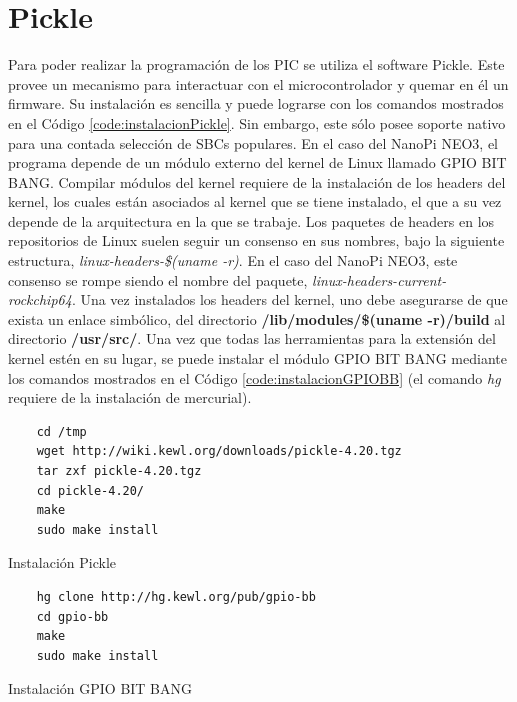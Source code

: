 \documentclass[12pt,letterpaper]{article}     %
\begin{document}
\clearpage
\section{Pickle}

Para poder realizar la programación de los PIC se utiliza el software Pickle. 
Este provee un mecanismo para interactuar con el microcontrolador y quemar en él un firmware.
Su instalación es sencilla y puede lograrse con los comandos mostrados en el Código \ref{code:instalacionPickle}.
Sin embargo, este sólo posee soporte nativo para una contada selección de SBCs populares. En el caso del NanoPi NEO3,
el programa depende de un módulo externo del kernel de Linux llamado GPIO BIT BANG.
Compilar módulos del kernel requiere de la instalación de los headers del kernel, los cuales están asociados al kernel
que se tiene instalado, el que a su vez depende de la arquitectura en la que se trabaje. Los paquetes de headers en los
repositorios de Linux suelen seguir un consenso en sus nombres, bajo la siguiente estructura, 
\textit{linux-headers-\$(uname -r)}. En el caso del NanoPi NEO3, este consenso se rompe siendo el nombre del paquete, 
\textit{linux-headers-current-rockchip64}. Una vez instalados los headers del kernel, uno debe asegurarse de que exista
un enlace simbólico, del directorio \textbf{/lib/modules/\$(uname -r)/build} al directorio \textbf{/usr/src/}.
Una vez que todas las herramientas para la extensión del kernel estén en su lugar, se puede instalar el módulo 
GPIO BIT BANG mediante los comandos mostrados en el Código \ref{code:instalacionGPIOBB} (el comando \textit{hg} requiere
de la instalación de mercurial).

\begin{codigo}[]
	\begin{lstlisting}
	cd /tmp
	wget http://wiki.kewl.org/downloads/pickle-4.20.tgz 
	tar zxf pickle-4.20.tgz 
	cd pickle-4.20/
	make
	sudo make install
	\end{lstlisting}
	\caption{Instalación Pickle}
	\label{code:instalacionPickle}
\end{codigo}

\begin{codigo}[!h]
	\begin{lstlisting}
	hg clone http://hg.kewl.org/pub/gpio-bb
	cd gpio-bb
	make
	sudo make install
	\end{lstlisting}
	\caption{Instalación GPIO BIT BANG}
	\label{code:instalacionGPIOBB}
\end{codigo}
\end{document}
